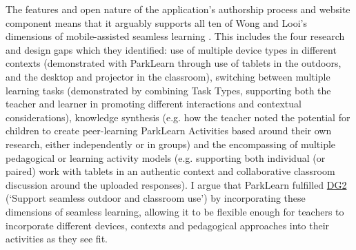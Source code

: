 The features and open nature of the application's authorship process and website component means that it arguably supports all ten of Wong and Looi’s dimensions of mobile-assisted seamless learning \citep{Wong2011}.  This includes the four research and design gaps which they identified: use of multiple device types in different contexts (demonstrated with ParkLearn through use of tablets in the outdoors, and the desktop and projector in the classroom), switching between multiple learning tasks (demonstrated by combining Task Types, supporting both the teacher and learner in promoting different interactions and contextual considerations), knowledge synthesis (e.g. how the teacher noted the potential for children to create peer-learning ParkLearn Activities based around their own research, either independently or in groups) and the encompassing of multiple pedagogical or learning activity models (e.g. supporting both individual (or paired) work with tablets in an authentic context and collaborative classroom discussion around the uploaded responses). I argue that ParkLearn fulfilled \hyperref[DG2]{DG2} (`Support seamless outdoor and classroom use') by incorporating these dimensions of seamless learning, allowing it to be flexible enough for teachers to incorporate different devices, contexts and pedagogical approaches into their activities as they see fit.
  
